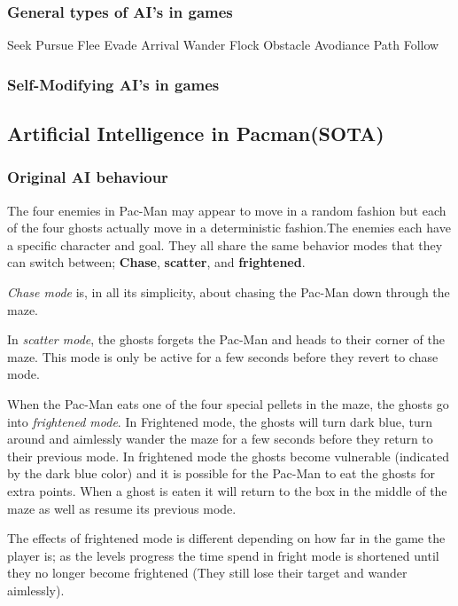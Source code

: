 \subsubsection{General types of AI's in games}

Seek
Pursue
Flee
Evade
Arrival
Wander
Flock
Obstacle Avodiance
Path Follow






\subsubsection{Self-Modifying AI's in games}


\subsection{Artificial Intelligence in Pacman(SOTA)}

\subsubsection{Original AI behaviour}
The four enemies in Pac-Man may appear to move in a random fashion but each of the four ghosts actually move in a deterministic fashion.The enemies each have a specific character and goal. They all share the same behavior modes that they can switch between; \textbf{Chase}, \textbf{scatter}, and \textbf{frightened}.

\emph{Chase mode} is, in all its simplicity, about chasing the Pac-Man down through the maze.

In \emph{scatter mode}, the ghosts forgets the Pac-Man and heads to their corner of the maze. This mode is only be active for a few seconds before they revert to chase mode.

When the Pac-Man eats one of the four special pellets in the maze, the ghosts go into \emph{frightened mode}. In Frightened mode, the ghosts will turn dark blue, turn around and aimlessly wander the maze for a few seconds before they return to their previous mode. In frightened mode the ghosts become vulnerable (indicated by the dark blue color) and it is possible for the Pac-Man to eat the ghosts for extra points. When a ghost is eaten it will return to the box in the middle of the maze as well as resume its previous mode.

The effects of frightened mode is different depending on how far in the game the player is; as the levels progress the time spend in fright mode is shortened until they no longer become frightened (They still lose their target and wander aimlessly).


